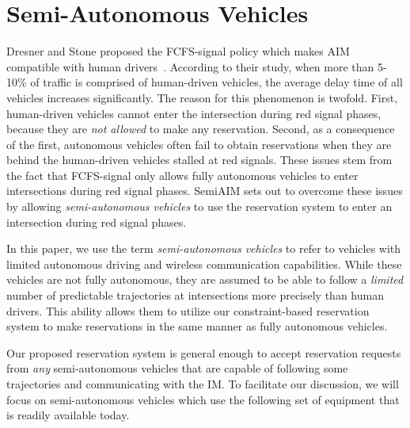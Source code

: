 \section{Semi-Autonomous Vehicles}
\label{sec:vehicles}

Dresner and Stone proposed the FCFS-signal policy which makes AIM
compatible with human drivers~\cite{bib:Dresner07Sharing}. According
to their study, when more than 5-10\% of traffic is comprised of
human-driven vehicles, the average delay time of all vehicles
increases significantly.  The reason for this phenomenon is twofold.
First, human-driven vehicles cannot enter the intersection during red
signal phases, because they are \emph{not allowed} to make any
reservation.  Second, as a consequence of the first, autonomous
vehicles often fail to obtain reservations when they are
behind the human-driven vehicles stalled at red signals.  These issues
stem from the fact that FCFS-signal only allows fully autonomous
vehicles to enter intersections during red signal phases.
SemiAIM sets out to overcome these issues by allowing
\emph{semi-autonomous vehicles} to use the reservation system
to enter an intersection during red signal phases.

In this paper, we use the term \emph{semi-autonomous vehicles} to
refer to vehicles with limited autonomous driving and wireless
communication capabilities.  While these vehicles are not fully
autonomous, they are assumed to be able to follow a \emph{limited}
number of predictable trajectories at intersections more precisely
than human drivers.  This ability allows them to utilize our
constraint-based reservation system to make reservations in the same
manner as fully autonomous vehicles.

Our proposed reservation system is general enough to accept
reservation requests from \emph{any} semi-autonomous vehicles that are
capable of following some trajectories and communicating with the IM.
To facilitate our discussion, we will focus on semi-autonomous
vehicles which use the following set of equipment that is readily
available today.

